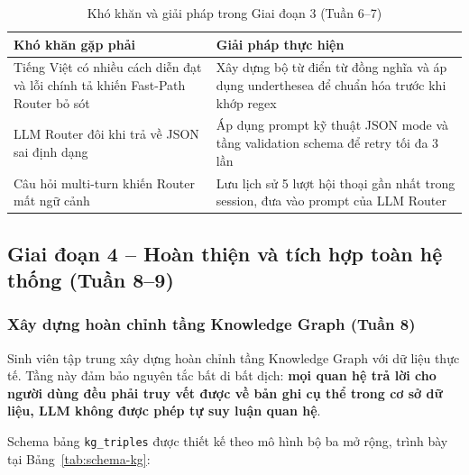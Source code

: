 \begin{table}[H]
\caption{Khó khăn và giải pháp trong Giai đoạn 3 (Tuần 6--7)}
\label{tab:kho-khan-gd3}
\centering
\begin{tabular}{|p{5.5cm}|p{8cm}|}
\hline
\textbf{Khó khăn gặp phải} & \textbf{Giải pháp thực hiện} \\
\hline
Tiếng Việt có nhiều cách diễn đạt và lỗi chính tả khiến Fast-Path Router bỏ sót & Xây dựng bộ từ điển từ đồng nghĩa và áp dụng underthesea để chuẩn hóa trước khi khớp regex \\
\hline
LLM Router đôi khi trả về JSON sai định dạng & Áp dụng prompt kỹ thuật JSON mode và tầng validation schema để retry tối đa 3 lần \\
\hline
Câu hỏi multi-turn khiến Router mất ngữ cảnh & Lưu lịch sử 5 lượt hội thoại gần nhất trong session, đưa vào prompt của LLM Router \\
\hline
\end{tabular}
\end{table}

\subsection{Giai đoạn 4 -- Hoàn thiện và tích hợp toàn hệ thống (Tuần 8--9)}

\subsubsection{Xây dựng hoàn chỉnh tầng Knowledge Graph (Tuần 8)}

Sinh viên tập trung xây dựng hoàn chỉnh tầng Knowledge Graph với dữ liệu thực tế. Tầng này đảm bảo nguyên tắc bất di bất dịch: \textbf{mọi quan hệ trả lời cho người dùng đều phải truy vết được về bản ghi cụ thể trong cơ sở dữ liệu, LLM không được phép tự suy luận quan hệ}.

Schema bảng \texttt{kg\_triples} được thiết kế theo mô hình bộ ba mở rộng, trình bày tại Bảng~\ref{tab:schema-kg}:

